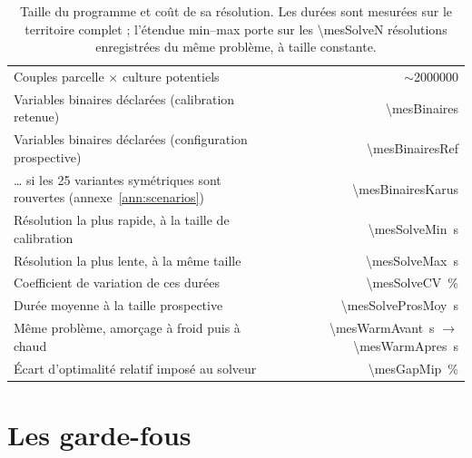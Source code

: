\begin{table}[h]
  \centering
  \caption{Taille du programme et coût de sa résolution. Les durées sont mesurées sur le
  territoire complet ; l'étendue min--max porte sur les \num{\mesSolveN} résolutions
  enregistrées du même problème, à taille constante.}
  \label{tab:programme}
  \small
  \begin{tabularx}{\textwidth}{@{}>{\raggedright\arraybackslash}Xr@{}}
    \toprule
    Couples parcelle $\times$ culture potentiels & $\sim$\num{2000000} \\
    Variables binaires déclarées (calibration retenue) & \num{\mesBinaires} \\
    Variables binaires déclarées (configuration prospective) & \num{\mesBinairesRef} \\
    \dots{} si les \num{25} variantes symétriques sont rouvertes
      (annexe~\ref{ann:scenarios}) & \num{\mesBinairesKarus} \\
    \midrule
    Résolution la plus rapide, à la taille de calibration & \SI{\mesSolveMin}{\second} \\
    Résolution la plus lente, à la même taille & \SI{\mesSolveMax}{\second} \\
    Coefficient de variation de ces durées & \SI{\mesSolveCV}{\percent} \\
    Durée moyenne à la taille prospective & \SI{\mesSolveProsMoy}{\second} \\
    Même problème, amorçage à froid puis à chaud
      & \SI{\mesWarmAvant}{\second} $\rightarrow$ \SI{\mesWarmApres}{\second} \\
    Écart d'optimalité relatif imposé au solveur & \SI{\mesGapMip}{\percent} \\
    \bottomrule
  \end{tabularx}
\end{table}

\section{Les garde-fous}
\label{sec:gardefous}

